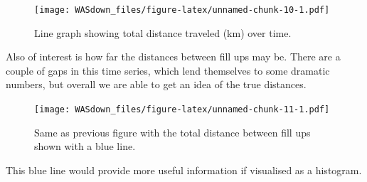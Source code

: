 \documentclass[]{book}
\newenvironment{Shaded}{\begin{snugshade}}{\end{snugshade}}
\newcommand{\KeywordTok}[1]{\textcolor[rgb]{0.13,0.29,0.53}{\textbf{{#1}}}}
\newcommand{\DataTypeTok}[1]{\textcolor[rgb]{0.13,0.29,0.53}{{#1}}}
\newcommand{\DecValTok}[1]{\textcolor[rgb]{0.00,0.00,0.81}{{#1}}}
\newcommand{\StringTok}[1]{\textcolor[rgb]{0.31,0.60,0.02}{{#1}}}
\newcommand{\CommentTok}[1]{\textcolor[rgb]{0.56,0.35,0.01}{\textit{{#1}}}}
\newcommand{\NormalTok}[1]{{#1}}
\theoremstyle{definition}
\theoremstyle{definition}
\theoremstyle{remark}
\begin{document}
\begin{figure}[htbp]
\centering
\texttt{[image: WASdown\_files/figure-latex/unnamed-chunk-10-1.pdf]}
\caption{\label{fig:unnamed-chunk-10}Line graph showing total distance
traveled (km) over time.}
\end{figure}

Also of interest is how far the distances between fill ups may be. There
are a couple of gaps in this time series, which lend themselves to some
dramatic numbers, but overall we are able to get an idea of the true
distances.

\begin{Shaded}
\end{Shaded}

\begin{figure}[htbp]
\centering
\texttt{[image: WASdown\_files/figure-latex/unnamed-chunk-11-1.pdf]}
\caption{\label{fig:unnamed-chunk-11}Same as previous figure with the total
distance between fill ups shown with a blue line.}
\end{figure}

This blue line would provide more useful information if visualised as a
histogram.
\end{document}
